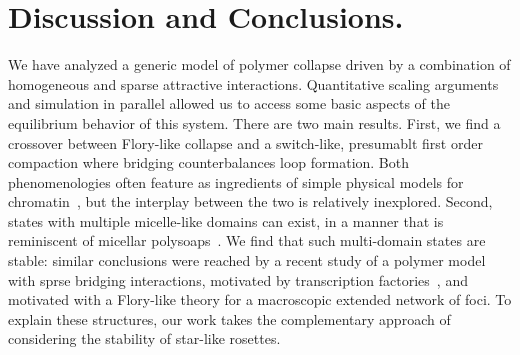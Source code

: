 \documentclass[
preprint,
a4paper,
12pt,
superscriptaddress,
pre]{revtex4}
\begin{document}


\section{Discussion and Conclusions. }
\label{sec:Disc}


We have analyzed a generic model of polymer collapse driven by a
combination of homogeneous and sparse attractive interactions.
Quantitative scaling arguments and simulation in parallel allowed us
to access some basic aspects of the equilibrium behavior of this
system.
%
%
There are two main results. 
First, we find a crossover between Flory-like collapse and a
switch-like, presumablt first order compaction where bridging
counterbalances loop formation. Both phenomenologies often feature as
ingredients of simple physical models for
chromatin~\cite{Marenduzzo2006c,Brackley2013,Barbieri2013b,Mirny2011,Buenemann2010},
but the interplay between the two is relatively inexplored.
Second, states with multiple micelle-like domains can exist, in a
manner that is reminiscent of micellar
polysoaps~\cite{Borisov1996}. We find that such multi-domain states
are stable: similar conclusions were reached by a recent study of a
polymer model with sprse bridging interactions, motivated by
transcription factories~\cite{Junier2010}, and motivated with a
Flory-like theory for a macroscopic extended network of foci. To
explain these structures, our work takes the complementary approach of
considering the stability of star-like rosettes.
%
\end{document}
